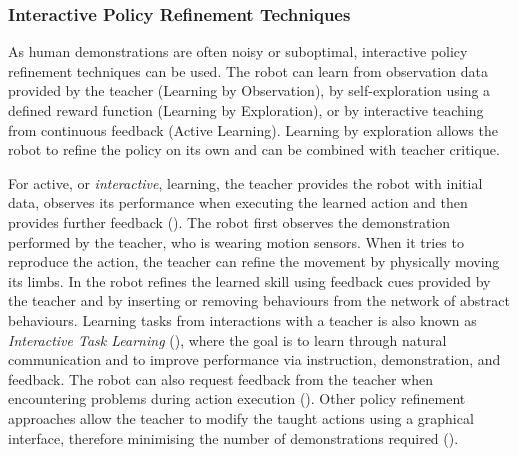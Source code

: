 \subsubsection{Interactive Policy Refinement Techniques}\label{subsec:Other RP Methods}
As human demonstrations are often noisy or suboptimal, interactive policy refinement techniques can be used.
The robot can learn from observation data provided by the teacher (Learning by Observation), by self-exploration using a defined reward function (Learning by Exploration), or by interactive teaching from continuous feedback (Active Learning). 
Learning by exploration allows the robot to refine the policy on its own and can be combined with teacher critique. 

For active, or \textit{interactive}, learning, the teacher provides the robot with initial data, observes its performance when executing the learned action and then provides further feedback (\cite{nicolescu2003natural,calinon2007active,calinon2007incremental}).
The robot first observes the demonstration performed by the teacher, who is wearing motion sensors. 
When it tries to reproduce the action, the teacher can refine the movement by physically moving its limbs.
In \cite{nicolescu2003natural} the robot refines the learned skill using feedback cues provided by the teacher and by inserting or removing behaviours from the network of abstract behaviours.
Learning tasks from interactions with a teacher is also known as \textit{Interactive Task Learning} (\cite{laird2017interactive}), where the goal is to learn through natural communication and to improve performance via instruction, demonstration, and feedback. 
The robot can also request feedback from the teacher when encountering problems during action execution (\cite{cakmak2012aaai,abdo2013learning,martinez2017relational}).
Other policy refinement approaches allow the teacher to modify the taught actions using a graphical interface, therefore minimising the number of demonstrations required (\cite{alexandrova2015roboflow,paxton2017costar,perzylo2016intuitive,stenmark2017simplified}).

